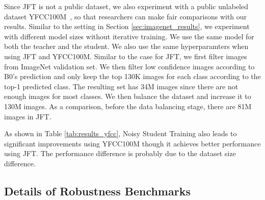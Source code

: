 \documentclass[10pt,twocolumn,letterpaper]{article}
\begin{document}
Since JFT is not a public dataset, we also experiment with a public unlabeled dataset YFCC100M~\cite{thomee2016yfcc100m}, so that researchers can make fair comparisons with our results. Similar to the setting in Section \ref{sec:imagenet_results}, we experiment with different model sizes without iterative training. We use the same model for both the teacher and the student. We also use the same hyperparamters when using JFT and YFCC100M.
Similar to the case for JFT, we first filter images from ImageNet validation set. We then filter low confidence images according to B0's prediction and only keep the top 130K images for each class according to the top-1 predicted class. The resulting set has 34M images since there are not enough images for most classes. We then balance the dataset and increase it to 130M images. As a comparison, before the data balancing stage, there are 81M images in JFT. 


As shown in Table \ref{tab:results_yfcc}, Noisy Student Training also leads to significant improvements using YFCC100M though it achieves better performance using JFT. 
The performance difference is probably due to the dataset size difference.



\subsection{Details of Robustness Benchmarks}
\label{sec:robustness}
\end{document}
